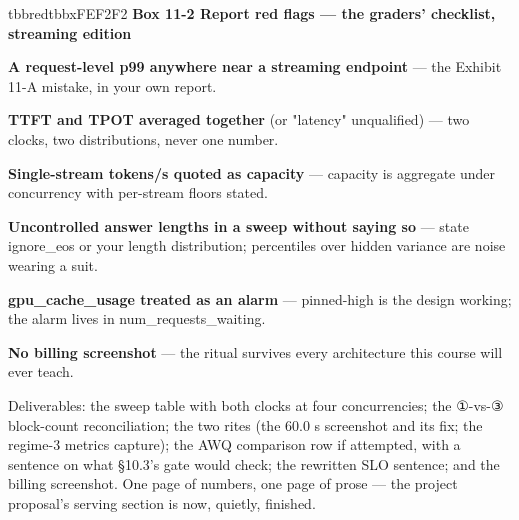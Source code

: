 \begin{calloutbox}{tbbred}{tbbxFEF2F2}
{\normalsize\bfseries\color{tbbx991B1B}Box 11-2  Report red flags — the graders' checklist, streaming edition}\par\vspace{3pt}
\begin{tbbitemize}
  \item \textbf{A request-level p99 anywhere near a streaming endpoint} — the Exhibit 11-A mistake, in your own report.
  \item \textbf{TTFT and TPOT averaged together} (or "latency" unqualified) — two clocks, two distributions, never one number.
  \item \textbf{Single-stream tokens/s quoted as capacity} — capacity is aggregate under concurrency with per-stream floors stated.
  \item \textbf{Uncontrolled answer lengths in a sweep without saying so} — state ignore\_eos or your length distribution; percentiles over hidden variance are noise wearing a suit.
  \item \textbf{gpu\_cache\_usage treated as an alarm} — pinned-high is the design working; the alarm lives in num\_requests\_waiting.
  \item \textbf{No billing screenshot} — the ritual survives every architecture this course will ever teach.
\end{tbbitemize}
\end{calloutbox}

\vspace{3.0pt}

Deliverables: the sweep table with both clocks at four concurrencies; the ①-vs-③ block-count reconciliation; the two rites (the 60.0 s screenshot and its fix; the regime-3 metrics capture); the AWQ comparison row if attempted, with a sentence on what §10.3's gate would check; the rewritten SLO sentence; and the billing screenshot. One page of numbers, one page of prose — the project proposal's serving section is now, quietly, finished.

